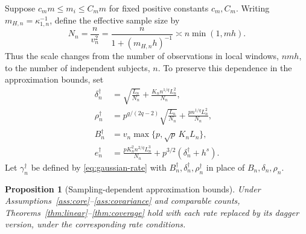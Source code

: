 \documentclass[12pt]{article}
\newtheorem{proposition}{Proposition}
\numberwithin{equation}{section}
\begin{document}
Suppose $c_m m\le m_i\le C_m m$ for fixed positive constants $c_m,C_m$.
Writing $m_{H,n}=\kappa_{1,n}^{-1}$, define the effective sample size by
\begin{equation}
N_n=\frac{n}{v_n^2}=\frac{n}{1+(m_{H,n}h)^{-1}}
\asymp n\min(1,mh).
\label{eq:effective-sample-size}
\end{equation}
Thus the scale changes from the number of observations in local windows,
$nmh$, to the number of independent subjects, $n$. To preserve this
dependence in the approximation bounds, set
\begin{equation*}
\begin{aligned}
\delta_n^\dagger&=\sqrt{\frac{L_n}{N_n}}
+\frac{K_n n^{1/q}L_n^2}{N_n},\\
\rho_n^\dagger&=p^{q/(2q-2)}\sqrt{\frac{L_n}{N_n}}
+\frac{p n^{1/q}L_n^2}{N_n},\\
B_n^\dagger&=v_n\max\{p,\sqrt p\,K_nL_n\},\\
e_n^\dagger&=\frac{pK_n^2 n^{2/q}L_n^3}{N_n}
+p^{3/2}(\delta_n^\dagger+h^s).
\end{aligned}
\end{equation*}
Let $\gamma_n^\dagger$ be defined by
\eqref{eq:gaussian-rate} with $B_n^\dagger,\delta_n^\dagger,\rho_n^\dagger$
in place of $B_n,\delta_n,\rho_n$.

\begin{proposition}[Sampling-dependent approximation bounds]
\label{prop:sampling-rates}
Under Assumptions~\ref{ass:core}--\ref{ass:covariance} and comparable counts,
Theorems~\ref{thm:linear}--\ref{thm:coverage} hold with each rate
replaced by its dagger version, under the corresponding rate conditions.
\end{proposition}
\end{document}
